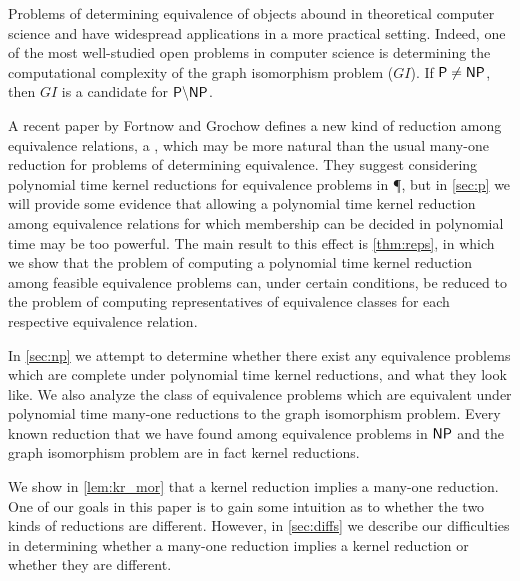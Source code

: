 Problems of determining equivalence of objects abound in theoretical computer
science and have widespread applications in a more practical setting. Indeed,
one of the most well-studied open problems in computer science is determining
the computational complexity of the graph isomorphism problem ($GI$). If
${\mathsf{P}}\neq{\ensuremath{\mathsf{NP}}}$, then $GI$ is a candidate for ${\mathsf{P}}\backslash{\ensuremath{\mathsf{NP}}}$.

A recent paper by Fortnow and Grochow \cite{fg09} defines a new kind of
reduction among equivalence relations, a , which may be
more natural than the usual many-one reduction for problems of determining
equivalence. They suggest considering polynomial time kernel reductions for
equivalence problems in \P, but in \autoref{sec:p} we will provide some
evidence that allowing a polynomial time kernel reduction among equivalence
relations for which membership can be decided in polynomial time may be too
powerful. The main result to this effect is \autoref{thm:reps}, in which we
show that the problem of computing a polynomial time kernel reduction among
feasible equivalence problems can, under certain conditions, be reduced to the
problem of computing representatives of equivalence classes for each respective
equivalence relation.

In \autoref{sec:np} we attempt to determine whether there exist any equivalence
problems which are complete under polynomial time kernel reductions, and what
they look like. We also analyze the class of equivalence problems which are
equivalent under polynomial time many-one reductions to the graph isomorphism
problem. Every known reduction that we have found among equivalence problems in
${\mathsf{NP}}$ and the graph isomorphism problem are in fact kernel reductions.

We show in \autoref{lem:kr_mor} that a kernel reduction implies a many-one
reduction. One of our goals in this paper is to gain some intuition as to
whether the two kinds of reductions are different. However,
in \autoref{sec:diffs} we describe our difficulties in determining whether a
many-one reduction implies a kernel reduction or whether they are different.
